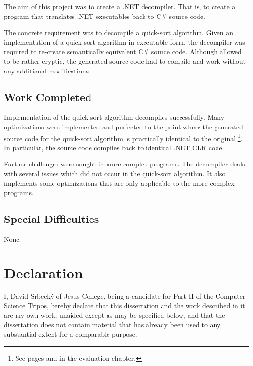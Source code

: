 \documentclass[12pt,twoside,notitlepage]{report}
\begin{document}
The aim of this project was to create a .NET decompiler.
That is, to create a program that translates .NET executables 
back to C\# source code.

The concrete requirement was to decompile a 
quick-sort algorithm.  Given an implementation of a quick-sort 
algorithm in executable form, the decompiler was required
to re-create semantically equivalent C\# source code.  
Although allowed to be rather cryptic, the generated source code 
had to compile and work without any additional modifications.


\subsection*{Work Completed}

Implementation of the quick-sort algorithm decompiles successfully.
Many optimizations were implemented and perfected to the
point where the generated source code for the quick-sort 
algorithm is practically identical to the original%
\footnote{See pages \pageref{Original quick-sort} and \pageref{Decompiled quick-sort} in the evaluation chapter.}.
In particular, the source code compiles back to identical .NET CLR code.

Further challenges were sought in more complex programs.
The decompiler deals with several issues which did not
occur in the quick-sort algorithm.  It also implements some
optimizations that are only applicable to the more complex programs.


\subsection*{Special Difficulties}

None.
 
\newpage
\section*{Declaration}

I, David Srbeck\'y of Jesus College, being a candidate for Part II of the Computer
Science Tripos, hereby declare
that this dissertation and the work described in it are my own work,
unaided except as may be specified below, and that the dissertation
does not contain material that has already been used to any substantial
extent for a comparable purpose.

\bigskip
{}

\medskip
{}
\end{document}
